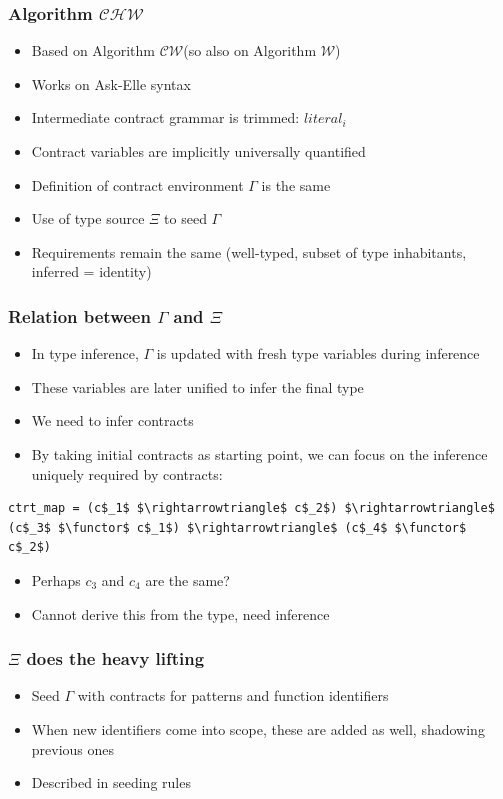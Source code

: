 \documentclass[]{beamer}
\makeatletter
\newcommand{\functor}{<\!\!\!@\!\!\!>}
\newcommand{\W}{$\mathcal{W}$}
\newcommand{\CW}{$\mathcal{CW}$}
\newcommand{\CHW}{$\mathcal{CHW}$}
\makeatother
\begin{document}
\begin{frame}[fragile]
\frametitle{Algorithm \CHW}

\begin{itemize}
	\item Based on Algorithm \CW (so also on Algorithm \W)
	\item Works on Ask-Elle syntax
	\item Intermediate contract grammar is trimmed: $literal_i$
	\item Contract variables are implicitly universally quantified
	\item Definition of contract environment $\Gamma$ is the same
	\item Use of type source $\Xi$ to seed $\Gamma$
	\item Requirements remain the same (well-typed, subset of type inhabitants, inferred = identity)
\end{itemize}

\end{frame}

\begin{frame}[fragile]
\frametitle{Relation between $\Gamma$ and $\Xi$}

\begin{itemize}
	\item In type inference, $\Gamma$ is updated with fresh type variables during inference
	\item These variables are later unified to infer the final type
	\item We need to infer contracts
	\item By taking initial contracts as starting point, we can focus on the inference uniquely required by contracts:
\end{itemize}

\begin{lstlisting}[mathescape]
ctrt_map = (c$_1$ $\rightarrowtriangle$ c$_2$) $\rightarrowtriangle$ (c$_3$ $\functor$ c$_1$) $\rightarrowtriangle$ (c$_4$ $\functor$ c$_2$)
\end{lstlisting}

\begin{itemize}
	\item Perhaps $c_3$ and $c_4$ are the same?
	\item Cannot derive this from the type, need inference
\end{itemize}

\end{frame}

\begin{frame}[fragile]
\frametitle{$\Xi$ does the heavy lifting}

\begin{itemize}
	\item Seed $\Gamma$ with contracts for patterns and function identifiers
	\item When new identifiers come into scope, these are added as well, shadowing previous ones
	\item Described in seeding rules
\end{itemize}

\end{frame}
\end{document}
